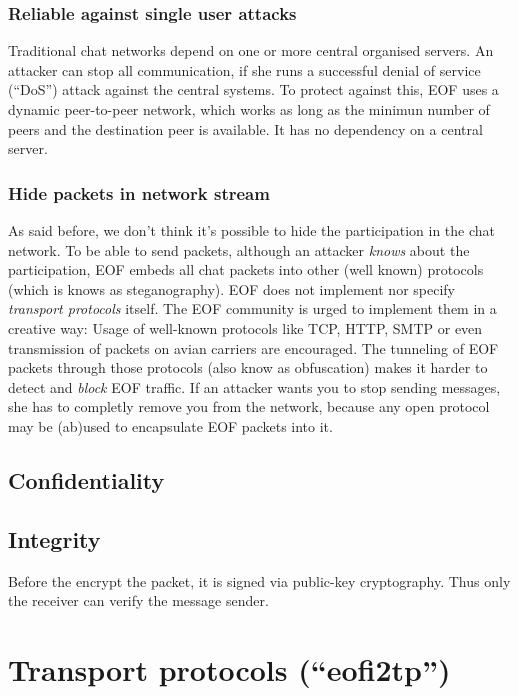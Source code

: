 \subsubsection{Reliable against single user attacks}
Traditional chat networks depend on one or more central organised servers.
An attacker can stop all communication, if she runs a successful denial
of service ("`DoS"') attack against the central systems.
To protect against this, EOF uses a dynamic peer-to-peer network, which works
as long as the minimun number of peers and the destination peer is available.
It has no dependency on a central server.

\subsubsection{Hide packets in network stream}
As said before, we don't think it's possible to hide the participation in the
chat network. To be able to send packets, although an attacker \emph{knows}
about the participation, EOF embeds all chat packets into other (well known)
protocols (which is knows as steganography\cite{stegano-1}).
EOF does not implement nor specify \emph{transport protocols} itself.
The EOF community is urged to implement them in a creative way: Usage
of well-known protocols like TCP\cite{tcp-1}, HTTP\cite{http-1},
SMTP\cite{smtp-1} or even transmission of packets on avian
carriers\cite{avian-1} are encouraged. The tunneling of EOF packets through
those protocols (also know as obfuscation) makes it harder to detect
and \emph{block} EOF traffic. 
If an attacker wants you to stop sending messages, she has to completly
remove you from the network, because any open protocol may be (ab)used to
encapsulate EOF packets into it.




\subsection{Confidentiality}

\subsection{Integrity}
Before the encrypt the packet, it is signed via public-key
cryptography\cite{pgp-1}. Thus only the receiver can verify the message sender.


\section{Transport protocols ("`eofi2tp"')}
\label{eofi2tp}
